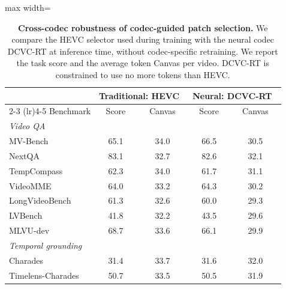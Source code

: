 \begin{table}[t]
\centering
\small
\setlength{\tabcolsep}{6pt}
\newcommand{\cv}[1]{{\color{canvascol}#1}}
\caption{
\textbf{Cross-codec robustness of codec-guided patch selection.}
We compare the HEVC selector used during training with the neural
codec DCVC-RT at inference time, without codec-specific retraining.
We report the task score and the average token \cv{Canvas} per video.
DCVC-RT is constrained to use no more tokens than HEVC.}
\label{tab:dcvc_vs_hevc}
\begin{adjustbox}{max width=\textwidth}
\begin{tabular}{l c c c c}
\toprule
& \multicolumn{2}{c}{Traditional: HEVC~\cite{sullivan2012hevc}} & \multicolumn{2}{c}{Neural: DCVC-RT~\cite{jia2025towards}} \\
\cmidrule(lr){2-3} \cmidrule(lr){4-5}
Benchmark & Score & \cv{Canvas} & Score & \cv{Canvas} \\
\midrule
\multicolumn{5}{l}{\textit{Video QA}} \\
MV-Bench~\cite{bench_mvbench}             & 65.1 & \cv{34.0} & 66.5 & \cv{30.5} \\
NextQA~\cite{bench_nextqa}               & 83.1 & \cv{32.7} & 82.6 & \cv{32.1} \\
TempCompass~\cite{bench_tempcompass}          & 62.3 & \cv{34.0} & 61.7 & \cv{31.1} \\
VideoMME~\cite{bench_videomme}             & 64.0 & \cv{33.2} & 64.3 & \cv{30.2} \\
LongVideoBench~\cite{bench_longvideobench}       & 61.3 & \cv{32.6} & 60.0 & \cv{29.3} \\
LVBench~\cite{bench_lvbench}              & 41.8 & \cv{32.2} & 43.5 & \cv{29.6} \\
MLVU-dev~\cite{bench_mlvu}             & 68.7 & \cv{33.6} & 66.1 & \cv{29.9} \\
\midrule
\multicolumn{5}{l}{\textit{Temporal grounding}} \\
Charades~\cite{bench_charades_sta}             & 31.4 & \cv{33.7} & 31.6 & \cv{32.0} \\
Timelens-Charades~\cite{zhang2025timelens}    & 50.7 & \cv{33.5} & 50.5 & \cv{31.9} \\

\end{tabular}
\end{adjustbox}
\end{table}
